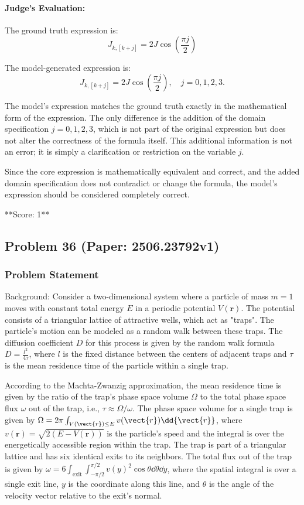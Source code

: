 \documentclass[10pt]{article}
\begin{document}
\paragraph*{Judge's Evaluation:}

The ground truth expression is:
\[
J_{k,[k+j]} = 2J \cos\left(\frac{\pi j}{2}\right)
\]

The model-generated expression is:
\[
J_{k,[k+j]} = 2J \cos\left(\frac{\pi j}{2}\right), \quad j=0,1,2,3.
\]

The model's expression matches the ground truth exactly in the mathematical form of the expression. The only difference is the addition of the domain specification \( j=0,1,2,3 \), which is not part of the original expression but does not alter the correctness of the formula itself. This additional information is not an error; it is simply a clarification or restriction on the variable \( j \).

Since the core expression is mathematically equivalent and correct, and the added domain specification does not contradict or change the formula, the model's expression should be considered completely correct.

**Score: 1**

\newpage
\subsection*{Problem 36 (Paper: 2506.23792v1)}
\subsubsection*{Problem Statement}
Background:
Consider a two-dimensional system where a particle of mass $m=1$ moves with constant total energy $E$ in a periodic potential $V(\boldsymbol{r})$. The potential consists of a triangular lattice of attractive wells, which act as "traps". The particle's motion can be modeled as a random walk between these traps. The diffusion coefficient $D$ for this process is given by the random walk formula $D = \frac{l^2}{4\tau}$, where $l$ is the fixed distance between the centers of adjacent traps and $\tau$ is the mean residence time of the particle within a single trap.

According to the Machta-Zwanzig approximation, the mean residence time is given by the ratio of the trap's phase space volume $\Omega$ to the total phase space flux $\omega$ out of the trap, i.e., $\tau \approx \Omega/\omega$. The phase space volume for a single trap is given by $\Omega = 2\pi \int_{V(\vect{r}) \leq E} v(\vect{r}) \dd{\vect{r}}$, where $v(\boldsymbol{r}) = \sqrt{2(E - V(\boldsymbol{r}))}$ is the particle's speed and the integral is over the energetically accessible region within the trap. The trap is part of a triangular lattice and has six identical exits to its neighbors. The total flux out of the trap is given by $\omega = 6 \int_{\text{exit}} \int_{-\pi/2}^{\pi/2} v(y)^2 \cos\theta \dd\theta \dd y$, where the spatial integral is over a single exit line, $y$ is the coordinate along this line, and $\theta$ is the angle of the velocity vector relative to the exit's normal.
\end{document}
